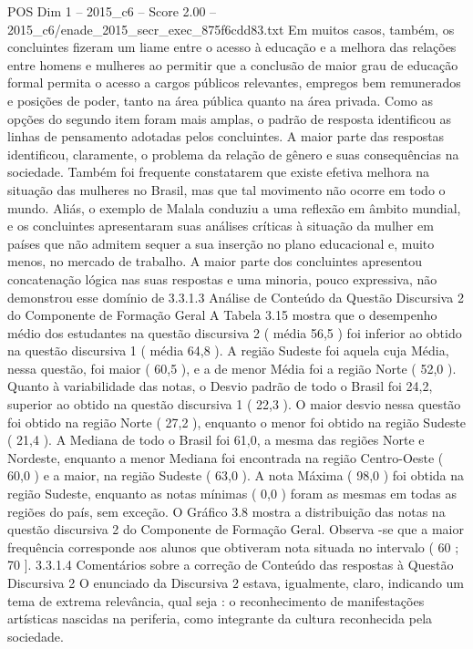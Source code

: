 \begin{textsample}{POS Dim 1 – 2015\_c6 – Score 2.00 – 2015\_c6/enade\_2015\_secr\_exec\_875f6cdd83.txt}
Em muitos casos, também, os concluintes fizeram um liame entre o acesso à educação e a melhora das relações entre homens e mulheres ao permitir que a conclusão de maior grau de educação formal permita o acesso a cargos públicos relevantes, empregos bem remunerados e posições de poder, tanto na área pública quanto na área privada.
Como as opções do segundo item foram mais amplas, o padrão de resposta identificou as linhas de pensamento adotadas pelos concluintes.
A maior parte das respostas identificou, claramente, o problema da relação de gênero e suas consequências na sociedade.
Também foi frequente constatarem que existe efetiva melhora na situação das mulheres no Brasil, mas que tal movimento não ocorre em todo o mundo.
Aliás, o exemplo de Malala conduziu a uma reflexão em âmbito mundial, e os concluintes apresentaram suas análises críticas à situação da mulher em países que não admitem sequer a sua inserção no plano educacional e, muito menos, no mercado de trabalho.
A maior parte dos concluintes apresentou concatenação lógica nas suas respostas e uma minoria, pouco expressiva, não demonstrou esse domínio de 3.3.1.3 Análise de Conteúdo da Questão Discursiva 2 do Componente de Formação Geral A Tabela 3.15 mostra que o desempenho médio dos estudantes na questão discursiva 2 ( média 56,5 ) foi inferior ao obtido na questão discursiva 1 ( média 64,8 ).
A região Sudeste foi aquela cuja Média, nessa questão, foi maior ( 60,5 ), e a de menor Média foi a região Norte ( 52,0 ).
Quanto à variabilidade das notas, o Desvio padrão de todo o Brasil foi 24,2, superior ao obtido na questão discursiva 1 ( 22,3 ).
O maior desvio nessa questão foi obtido na região Norte ( 27,2 ), enquanto o menor foi obtido na região Sudeste ( 21,4 ).
A Mediana de todo o Brasil foi 61,0, a mesma das regiões Norte e Nordeste, enquanto a menor Mediana foi encontrada na região Centro-Oeste ( 60,0 ) e a maior, na região Sudeste ( 63,0 ).
A nota Máxima ( 98,0 ) foi obtida na região Sudeste, enquanto as notas mínimas ( 0,0 ) foram as mesmas em todas as regiões do país, sem exceção.
O Gráfico 3.8 mostra a distribuição das notas na questão discursiva 2 do Componente de Formação Geral.
Observa -se que a maior frequência corresponde aos alunos que obtiveram nota situada no intervalo ( 60 ; 70 ]. 3.3.1.4 Comentários sobre a correção de Conteúdo das respostas à Questão Discursiva 2 O enunciado da Discursiva 2 estava, igualmente, claro, indicando um tema de extrema relevância, qual seja : o reconhecimento de manifestações artísticas nascidas na periferia, como integrante da cultura reconhecida pela sociedade.

\end{textsample}
